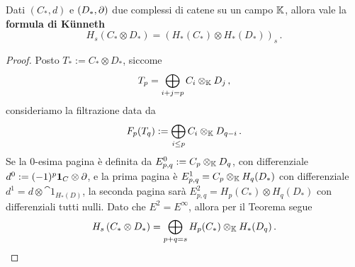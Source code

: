 \begin{ex}
	Dati $(C_{*},d)$ e $(D_{*},\partial)$ due complessi di catene su un campo $\mathbb{K}$,
	allora vale la \textbf{formula di Künneth}
	\begin{equation*}
		H_{s}\left( C_{*} \otimes D_{*} \right)
		= \left( H_{*}(C_{*}) \otimes H_{*}(D_{*}) \right)_{s}\,.
	\end{equation*}
	\begin{proof}
		Posto $T_{*} := C_{*} \otimes D_{*}$, siccome
		\begin{equation*}
			T_{p} = \bigoplus_{i+j=p}C_{i} \otimes_{\mathbb{K}} D_{j}\,,
		\end{equation*}
		consideriamo la filtrazione data da
		\begin{equation*}
			F_{p}(T_{q}) := \bigoplus_{i \le p} C_{i} \otimes_{\mathbb{K}} D_{q-i}\,. 
		\end{equation*}
		Se la $0$-esima pagina è definita da $E^{0}_{p,q} := C_{p} \otimes_{\mathbb{K}} D_{q}$,
		con differenziale $d^{0} := (-1)^{p} {\normalfont\textbf{1}}_{C} \otimes \partial$,
		e la prima pagina è $E^{1}_{p,q} = C_{p} \otimes_{\mathbb{K}} H_{q}(D_{*})$
		con differenziale $d^{1} = d \otimes \cat{1}_{H_{*}(D)}$,
		la seconda pagina sarà $E^{2}_{p,q} = H_{p}(C_{*}) \otimes H_{q}(D_{*})$
		con differenziali tutti nulli.
		Dato che $E^{2} = E^{\infty}$, allora per il Teorema segue
	\begin{equation*}
		H_{s}\left( C_{*} \otimes D_{*} \right)
		= \bigoplus_{p+q=s} H_{p}(C_{*}) \otimes_{\mathbb{K}} H_{*}(D_{q}) \,.
	\end{equation*}
	\end{proof}
\end{ex}

